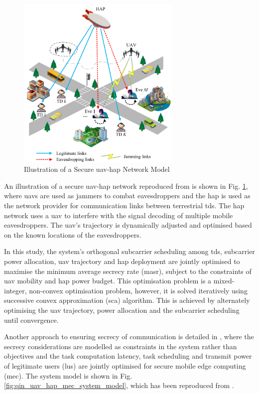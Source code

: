 \begin{figure}[ht!]
    \centering
    \includegraphics[width=0.7\textwidth]{figures/uav_haps_eves_diagram.png}
    \caption{Illustration of a Secure \acrshort{uav}-\acrshort{hap} Network Model}
    \label{fig:secure_uav_hap_zhang}
\end{figure}
An illustration of a secure \acrshort{uav}-\acrshort{hap} network reproduced from \cite{zhang_one_2025} is shown in Fig. \ref{fig:secure_uav_hap_zhang}, where \acrshort{uav}s are used as jammers to combat eavesdroppers and the \acrshort{hap} is used as the network provider for communication links between terrestrial \acrshort{td}s. 
The \acrshort{hap} network uses a \acrshort{uav} to interfere with the signal decoding of multiple mobile eavesdroppers. 
The \acrshort{uav}'s trajectory is dynamically adjusted and optimised based on the known locations of the eavesdroppers. 

In this study, the system's orthogonal subcarrier scheduling among \acrshort{td}s, subcarrier power allocation, \acrshort{uav} trajectory and \acrshort{hap} deployment are jointly optimised to maximise the minimum average secrecy rate (\acrshort{masr}), subject to the constraints of \acrshort{uav} mobility and \acrshort{hap} power budget.
This optimisation problem is a mixed-integer, non-convex optimisation problem, however, it is solved iteratively using successive convex approximation (\acrshort{sca}) algorithm. This is achieved by alternately optimising the \acrshort{uav} trajectory, power allocation and the subcarrier scheduling until convergence. 

Another approach to ensuring secrecy of communication is detailed in \cite{qin_secure_2023}, where the secrecy considerations are modelled as constraints in the system rather than objectives and the task computation latency, task scheduling and transmit power of legitimate users (\acrshort{lu}s) are jointly optimised for secure mobile edge computing (\acrshort{mec}). The system model is shown in Fig. \ref{fig:qin_uav_hap_mec_system_model}, which has been reproduced from \cite{qin_secure_2023}.

